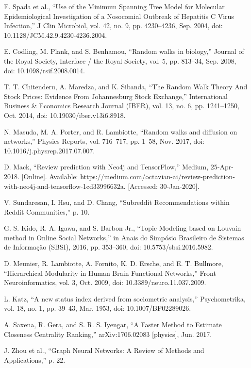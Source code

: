 \documentclass[journal,twoside,web]{ieeecolor}
\begin{document}
\begin{thebibliography}{9}
     E. Spada et al., “Use of the Minimum Spanning Tree Model for Molecular Epidemiological Investigation of a Nosocomial Outbreak of Hepatitis C Virus Infection,” J Clin Microbiol, vol. 42, no. 9, pp. 4230–4236, Sep. 2004, doi: 10.1128/JCM.42.9.4230-4236.2004.

     E. Codling, M. Plank, and S. Benhamou, “Random walks in biology,” Journal of the Royal Society, Interface / the Royal Society, vol. 5, pp. 813–34, Sep. 2008, doi: 10.1098/rsif.2008.0014.
    
     T. T. Chitenderu, A. Maredza, and K. Sibanda, “The Random Walk Theory And Stock Prices: Evidence From Johannesburg Stock Exchange,” International Business \& Economics Research Journal (IBER), vol. 13, no. 6, pp. 1241–1250, Oct. 2014, doi: 10.19030/iber.v13i6.8918.

     N. Masuda, M. A. Porter, and R. Lambiotte, “Random walks and diffusion on networks,” Physics Reports, vol. 716–717, pp. 1–58, Nov. 2017, doi: 10.1016/j.physrep.2017.07.007.
    
     D. Mack, “Review prediction with Neo4j and TensorFlow,” Medium, 25-Apr-2018. [Online]. Available: https://medium.com/octavian-ai/review-prediction-with-neo4j-and-tensorflow-1cd33996632a. [Accessed: 30-Jan-2020].
    
     V. Sundaresan, I. Hsu, and D. Chang, “Subreddit Recommendations within Reddit Communities,” p. 10.

     G. S. Kido, R. A. Igawa, and S. Barbon Jr., “Topic Modeling based on Louvain method in Online Social Networks,” in Anais do Simpósio Brasileiro de Sistemas de Informação (SBSI), 2016, pp. 353–360, doi: 10.5753/sbsi.2016.5982.
    
     D. Meunier, R. Lambiotte, A. Fornito, K. D. Ersche, and E. T. Bullmore, “Hierarchical Modularity in Human Brain Functional Networks,” Front Neuroinformatics, vol. 3, Oct. 2009, doi: 10.3389/neuro.11.037.2009.
    
     L. Katz, “A new status index derived from sociometric analysis,” Psychometrika, vol. 18, no. 1, pp. 39–43, Mar. 1953, doi: 10.1007/BF02289026.
    
     A. Saxena, R. Gera, and S. R. S. Iyengar, “A Faster Method to Estimate Closeness Centrality Ranking,” arXiv:1706.02083 [physics], Jun. 2017.
    
     J. Zhou et al., “Graph Neural Networks: A Review of Methods and Applications,” p. 22.

\end{thebibliography}
\end{document}
